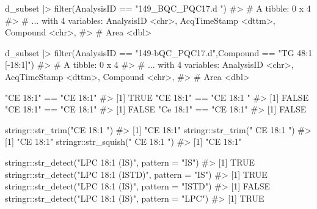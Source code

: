 \documentclass[
  letterpaper,
  DIV=11,
  numbers=noendperiod]{scrreprt}
\newenvironment{Shaded}{\begin{snugshade}}{\end{snugshade}}
\newcommand{\AttributeTok}[1]{\textcolor[rgb]{0.40,0.45,0.13}{#1}}
\newcommand{\CommentTok}[1]{\textcolor[rgb]{0.37,0.37,0.37}{#1}}
\newcommand{\FunctionTok}[1]{\textcolor[rgb]{0.28,0.35,0.67}{#1}}
\newcommand{\NormalTok}[1]{\textcolor[rgb]{0.00,0.23,0.31}{#1}}
\newcommand{\SpecialCharTok}[1]{\textcolor[rgb]{0.37,0.37,0.37}{#1}}
\newcommand{\StringTok}[1]{\textcolor[rgb]{0.13,0.47,0.30}{#1}}
\begin{document}
\begin{Shaded}
\begin{Highlighting}[]

\NormalTok{d\_subset }\SpecialCharTok{|\textgreater{}} \FunctionTok{filter}\NormalTok{(AnalysisID }\SpecialCharTok{==} \StringTok{"149\_BQC\_PQC17.d "}\NormalTok{)}
\CommentTok{\#\textgreater{} \# A tibble: 0 x 4}
\CommentTok{\#\textgreater{} \# ... with 4 variables: AnalysisID \textless{}chr\textgreater{}, AcqTimeStamp \textless{}dttm\textgreater{}, Compound \textless{}chr\textgreater{},}
\CommentTok{\#\textgreater{} \#   Area \textless{}dbl\textgreater{}}

\NormalTok{d\_subset }\SpecialCharTok{|\textgreater{}} \FunctionTok{filter}\NormalTok{(AnalysisID }\SpecialCharTok{==} \StringTok{"149{-}bQC\_PQC17.d"}\NormalTok{,Compound }\SpecialCharTok{==} \StringTok{"TG 48:1 [{-}18:1]"}\NormalTok{)}
\CommentTok{\#\textgreater{} \# A tibble: 0 x 4}
\CommentTok{\#\textgreater{} \# ... with 4 variables: AnalysisID \textless{}chr\textgreater{}, AcqTimeStamp \textless{}dttm\textgreater{}, Compound \textless{}chr\textgreater{},}
\CommentTok{\#\textgreater{} \#   Area \textless{}dbl\textgreater{}}

\StringTok{"CE 18:1"} \SpecialCharTok{==} \StringTok{"CE 18:1"}
\CommentTok{\#\textgreater{} [1] TRUE}
\StringTok{"CE 18:1"} \SpecialCharTok{==} \StringTok{"CE 18:1 "}
\CommentTok{\#\textgreater{} [1] FALSE}
\StringTok{"CE 18:1"} \SpecialCharTok{==} \StringTok{"CE  18:1"}
\CommentTok{\#\textgreater{} [1] FALSE}
\StringTok{"Ce 18:1"} \SpecialCharTok{==} \StringTok{"CE 18:1"}
\CommentTok{\#\textgreater{} [1] FALSE}

\NormalTok{stringr}\SpecialCharTok{::}\FunctionTok{str\_trim}\NormalTok{(}\StringTok{"CE 18:1 "}\NormalTok{)}
\CommentTok{\#\textgreater{} [1] "CE 18:1"}
\NormalTok{stringr}\SpecialCharTok{::}\FunctionTok{str\_trim}\NormalTok{(}\StringTok{"   CE    18:1 "}\NormalTok{)}
\CommentTok{\#\textgreater{} [1] "CE    18:1"}
\NormalTok{stringr}\SpecialCharTok{::}\FunctionTok{str\_squish}\NormalTok{(}\StringTok{"   CE    18:1 "}\NormalTok{)}
\CommentTok{\#\textgreater{} [1] "CE 18:1"}

\NormalTok{stringr}\SpecialCharTok{::}\FunctionTok{str\_detect}\NormalTok{(}\StringTok{"LPC 18:1 (IS)"}\NormalTok{, }\AttributeTok{pattern =} \StringTok{"IS"}\NormalTok{)}
\CommentTok{\#\textgreater{} [1] TRUE}
\NormalTok{stringr}\SpecialCharTok{::}\FunctionTok{str\_detect}\NormalTok{(}\StringTok{"LPC 18:1 (ISTD)"}\NormalTok{, }\AttributeTok{pattern =} \StringTok{"IS"}\NormalTok{)}
\CommentTok{\#\textgreater{} [1] TRUE}
\NormalTok{stringr}\SpecialCharTok{::}\FunctionTok{str\_detect}\NormalTok{(}\StringTok{"LPC 18:1 (IS)"}\NormalTok{, }\AttributeTok{pattern =} \StringTok{"ISTD"}\NormalTok{)}
\CommentTok{\#\textgreater{} [1] FALSE}
\NormalTok{stringr}\SpecialCharTok{::}\FunctionTok{str\_detect}\NormalTok{(}\StringTok{"LPC 18:1 (IS)"}\NormalTok{, }\AttributeTok{pattern =} \StringTok{"LPC"}\NormalTok{)}
\CommentTok{\#\textgreater{} [1] TRUE}


\end{Highlighting}
\end{Shaded}
\end{document}
